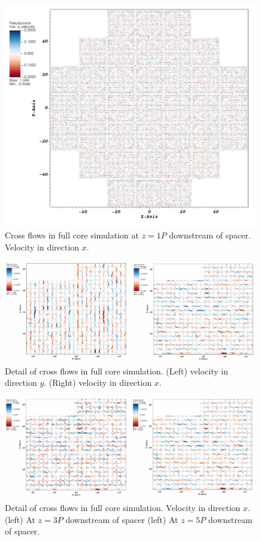 \begin{figure}[!ht]
\centering
\includegraphics[width=0.99\textwidth]{./figures/fullcore_msm_v01.png}
\caption{Cross flows in full core simulation at $z=1P$ downstream of spacer. Velocity in direction $x$. }
\label{fig:msm1}
\end{figure}

\begin{figure}[!ht]
\centering
\includegraphics[width=0.99\textwidth]{./figures/fullcore_msm_v02.png}
\caption{Detail of cross flows in full core simulation. (Left) velocity in direction $y$. (Right) velocity in direction $x$. }
\label{fig:msm2}
\end{figure}

\begin{figure}[!ht]
\centering
\includegraphics[width=0.99\textwidth]{./figures/fullcore_msm_v03.png}
\caption{Detail of cross flows in full core simulation. Velocity in direction $x$. (left) At $z=3P$ downstream of spacer  (left) At $z=5P$ downstream of spacer. }
\label{fig:msm3}
\end{figure}

